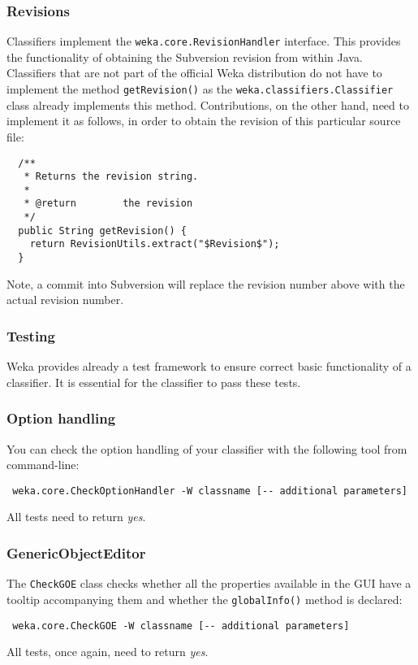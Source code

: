 \subsubsection*{Revisions}
\label{classifier_revisions}
Classifiers implement the \texttt{weka.core.RevisionHandler} interface. This
provides the functionality of obtaining the Subversion revision from within
Java. Classifiers that are not part of the official Weka distribution
do not have to implement the method \texttt{getRevision()} as the
\texttt{weka.classifiers.Classifier} class already implements this method.
Contributions, on the other hand, need to implement it as follows, in order to
obtain the revision of this particular source file:
\begin{verbatim}
  /**
   * Returns the revision string.
   *
   * @return        the revision
   */
  public String getRevision() {
    return RevisionUtils.extract("$Revision$");
  }
\end{verbatim}
Note, a commit into Subversion will replace the revision number above with the
actual revision number.

\subsubsection*{Testing}
Weka provides already a test framework to ensure correct basic functionality of
a classifier. It is essential for the classifier to pass these tests.

\subsubsection*{Option handling}
You can check the option handling of your classifier with the following tool
from command-line:
\begin{verbatim}
 weka.core.CheckOptionHandler -W classname [-- additional parameters]
\end{verbatim}
All tests need to return \textit{yes}.

\subsubsection*{GenericObjectEditor}
The \texttt{CheckGOE} class checks whether all the properties available in the
GUI have a tooltip accompanying them and whether the \texttt{globalInfo()}
method is declared:
\begin{verbatim}
 weka.core.CheckGOE -W classname [-- additional parameters]
\end{verbatim}
All tests, once again, need to return \textit{yes}.

